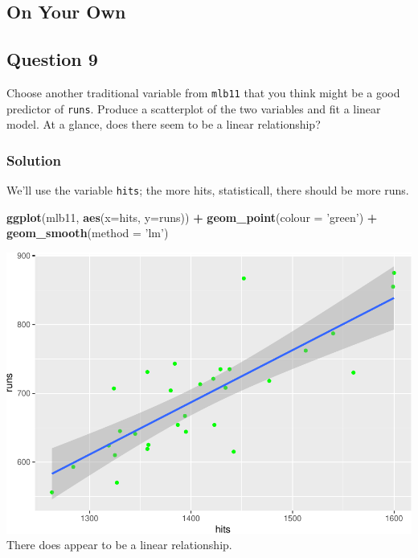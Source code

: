 \documentclass[]{article}
\newenvironment{Shaded}{\begin{snugshade}}{\end{snugshade}}
\newcommand{\KeywordTok}[1]{\textcolor[rgb]{0.13,0.29,0.53}{\textbf{#1}}}
\newcommand{\DataTypeTok}[1]{\textcolor[rgb]{0.13,0.29,0.53}{#1}}
\newcommand{\StringTok}[1]{\textcolor[rgb]{0.31,0.60,0.02}{#1}}
\newcommand{\OperatorTok}[1]{\textcolor[rgb]{0.81,0.36,0.00}{\textbf{#1}}}
\newcommand{\NormalTok}[1]{#1}
\begin{document}
\subsection{On Your Own}\label{on-your-own}

\subsection{Question 9}\label{question-9}

Choose another traditional variable from \texttt{mlb11} that you think
might be a good predictor of \texttt{runs}. Produce a scatterplot of the
two variables and fit a linear model. At a glance, does there seem to be
a linear relationship?

\subsubsection{Solution}\label{solution-8}

We'll use the variable \texttt{hits}; the more hits, statisticall, there
should be more runs.

\begin{Shaded}
\begin{Highlighting}[]
\KeywordTok{ggplot}\NormalTok{(mlb11, }\KeywordTok{aes}\NormalTok{(}\DataTypeTok{x=}\NormalTok{hits, }\DataTypeTok{y=}\NormalTok{runs)) }\OperatorTok{+}
\StringTok{  }\KeywordTok{geom_point}\NormalTok{(}\DataTypeTok{colour =} \StringTok{'green'}\NormalTok{) }\OperatorTok{+}
\StringTok{  }\KeywordTok{geom_smooth}\NormalTok{(}\DataTypeTok{method =} \StringTok{'lm'}\NormalTok{)}
\end{Highlighting}
\end{Shaded}

\includegraphics{DATA_606_Lab_7_files/figure-latex/question-nine-1.pdf}
There does appear to be a linear relationship.
\end{document}
